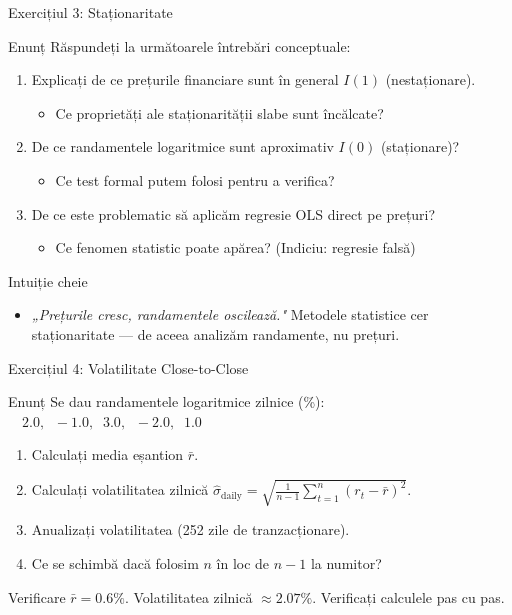 \documentclass[9pt, aspectratio=169, t]{beamer}
\theoremstyle{definition}
\begin{document}
\begin{frame}{Exercițiul 3: Staționaritate}
\begin{block}{Enunț}
Răspundeți la următoarele întrebări conceptuale:
\end{block}
\begin{enumerate}
    \item Explicați de ce prețurile financiare sunt în general $I(1)$ (nestaționare).
    \begin{itemize}
        \item Ce proprietăți ale staționarității slabe sunt încălcate?
    \end{itemize}
    \item De ce randamentele logaritmice sunt aproximativ $I(0)$ (staționare)?
    \begin{itemize}
        \item Ce test formal putem folosi pentru a verifica?
    \end{itemize}
    \item De ce este problematic să aplicăm regresie OLS direct pe prețuri?
    \begin{itemize}
        \item Ce fenomen statistic poate apărea? (Indiciu: regresie falsă)
    \end{itemize}
\end{enumerate}
\vspace{0.1cm}
\begin{alertblock}{Intuiție cheie}
\begin{itemize}\setlength{\itemsep}{0pt}
    \item \textit{„Prețurile cresc, randamentele oscilează."} Metodele statistice cer staționaritate --- de aceea analizăm randamente, nu prețuri.
\end{itemize}
\end{alertblock}
\end{frame}

\begin{frame}{Exercițiul 4: Volatilitate Close-to-Close}
\begin{block}{Enunț}
Se dau randamentele logaritmice zilnice (\%): $\quad 2.0, \;\; -1.0, \;\; 3.0, \;\; -2.0, \;\; 1.0$
\end{block}
\begin{enumerate}
    \item Calculați media eșantion $\bar{r}$.
    \item Calculați volatilitatea zilnică $\hat{\sigma}_{\text{daily}} = \sqrt{\frac{1}{n-1}\sum_{t=1}^{n}(r_t - \bar{r})^2}$.
    \item Anualizați volatilitatea (252 zile de tranzacționare).
    \item Ce se schimbă dacă folosim $n$ în loc de $n-1$ la numitor?
\end{enumerate}
\vspace{0.1cm}
\begin{exampleblock}{Verificare}
$\bar{r} = 0.6\%$. Volatilitatea zilnică $\approx 2.07\%$. Verificați calculele pas cu pas.
\end{exampleblock}
\end{frame}
\end{document}
